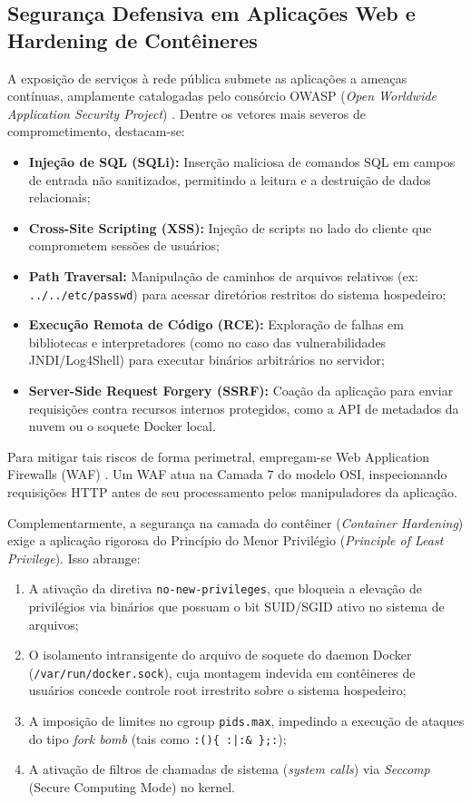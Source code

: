 \subsection{Segurança Defensiva em Aplicações Web e Hardening de Contêineres}
\label{sec:seguranca-hardening}

A exposição de serviços à rede pública submete as aplicações a ameaças contínuas, amplamente catalogadas pelo consórcio OWASP (\textit{Open Worldwide Application Security Project}) \cite{owasp2021}. Dentre os vetores mais severos de comprometimento, destacam-se:
\begin{itemize}
    \item \textbf{Injeção de SQL (SQLi):} Inserção maliciosa de comandos SQL em campos de entrada não sanitizados, permitindo a leitura e a destruição de dados relacionais;
    \item \textbf{Cross-Site Scripting (XSS):} Injeção de scripts no lado do cliente que comprometem sessões de usuários;
    \item \textbf{Path Traversal:} Manipulação de caminhos de arquivos relativos (ex: \texttt{../../etc/passwd}) para acessar diretórios restritos do sistema hospedeiro;
    \item \textbf{Execução Remota de Código (RCE):} Exploração de falhas em bibliotecas e interpretadores (como no caso das vulnerabilidades JNDI/Log4Shell) para executar binários arbitrários no servidor;
    \item \textbf{Server-Side Request Forgery (SSRF):} Coação da aplicação para enviar requisições contra recursos internos protegidos, como a API de metadados da nuvem ou o soquete Docker local.
\end{itemize}

Para mitigar tais riscos de forma perimetral, empregam-se Web Application Firewalls (WAF) \cite{stallings2017}. Um WAF atua na Camada 7 do modelo OSI, inspecionando requisições HTTP antes de seu processamento pelos manipuladores da aplicação.

Complementarmente, a segurança na camada do contêiner (\textit{Container Hardening}) exige a aplicação rigorosa do Princípio do Menor Privilégio (\textit{Principle of Least Privilege}). Isso abrange:
\begin{enumerate}
    \item A ativação da diretiva \texttt{no-new-privileges}, que bloqueia a elevação de privilégios via binários que possuam o bit SUID/SGID ativo no sistema de arquivos;
    \item O isolamento intransigente do arquivo de soquete do daemon Docker (\texttt{/var/run/docker.sock}), cuja montagem indevida em contêineres de usuários concede controle root irrestrito sobre o sistema hospedeiro;
    \item A imposição de limites no cgroup \texttt{pids.max}, impedindo a execução de ataques do tipo \textit{fork bomb} (tais como \texttt{:()\{ :|:\& \};:});
    \item A ativação de filtros de chamadas de sistema (\textit{system calls}) via \textit{Seccomp} (Secure Computing Mode) no kernel.
\end{enumerate}

